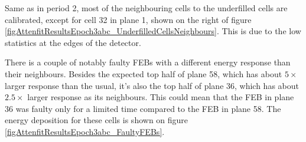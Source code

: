 \documentclass[12pt,a4paper]{article}
\begin{document}
Same as in period 2, most of the neighbouring cells to the underfilled cells are calibrated, except for cell 32 in plane 1, shown on the right of figure \ref{figAttenfitResultsEpoch3abc_UnderfilledCellsNeighbours}. This is due to the low statistics at the edges of the detector.

There is a couple of notably faulty FEBs with a different energy response than their neighbours. Besides the expected top half of plane 58, which has about $5\times$ larger response than the usual, it's also the top half of plane 36, which has about $2.5\times$ larger response as its neighbours. This could mean that the FEB in plane 36 was faulty only for a limited time compared to the FEB in plane 58. The energy deposition for these cells is shown on figure \ref{figAttenfitResultsEpoch3abc_FaultyFEBs}.
\end{document}
